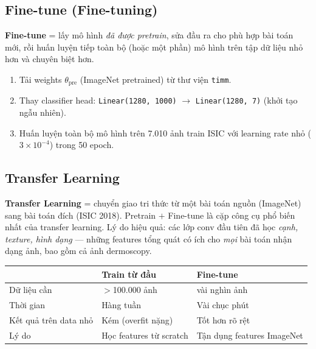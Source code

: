 \documentclass[11pt,a4paper]{article}
\begin{document}
\subsection{Fine-tune (Fine-tuning)}

\textbf{Fine-tune} = lấy mô hình \textit{đã được pretrain}, sửa đầu ra cho phù hợp bài toán mới, rồi huấn luyện tiếp toàn bộ (hoặc một phần) mô hình trên tập dữ liệu nhỏ hơn và chuyên biệt hơn.

\begin{example}
\begin{enumerate}[leftmargin=*]
  \item Tải weights $\theta_{\text{pre}}$ (ImageNet pretrained) từ thư viện \texttt{timm}.
  \item Thay classifier head: \texttt{Linear(1280, 1000)} $\to$ \texttt{Linear(1280, 7)} (khởi tạo ngẫu nhiên).
  \item Huấn luyện toàn bộ mô hình trên 7.010 ảnh train ISIC với learning rate nhỏ ($3{\times}10^{-4}$) trong 50 epoch.
\end{enumerate}
\end{example}

\subsection{Transfer Learning}

\textbf{Transfer Learning} = chuyển giao tri thức từ một bài toán nguồn (ImageNet) sang bài toán đích (ISIC 2018). Pretrain $+$ Fine-tune là cặp công cụ phổ biến nhất của transfer learning. Lý do hiệu quả: các lớp conv đầu tiên đã học \textit{cạnh, texture, hình dạng} --- những features tổng quát có ích cho \textit{mọi} bài toán nhận dạng ảnh, bao gồm cả ảnh dermoscopy.

\begin{table}[h]
\centering\small
\begin{tabular}{lll}
\toprule
 & \textbf{Train từ đầu} & \textbf{Fine-tune} \\
\midrule
Dữ liệu cần         & $>$100.000 ảnh        & vài nghìn ảnh \\
Thời gian           & Hàng tuần              & Vài chục phút \\
Kết quả trên data nhỏ & Kém (overfit nặng)    & Tốt hơn rõ rệt \\
Lý do               & Học features từ scratch & Tận dụng features ImageNet \\
\bottomrule
\end{tabular}
\end{table}
\end{document}
